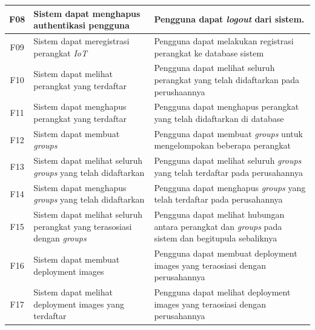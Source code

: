 \begin{table}
\begin{tabular}{|c|p{4.5cm}|p{8cm}|}
    \hline
    F08 & Sistem dapat menghapus authentikasi pengguna                                   & Pengguna dapat \textit{logout} dari sistem.                                                                \\
    \hline
    F09 & Sistem dapat meregistrasi perangkat \textit{IoT}                               & Pengguna dapat melakukan registrasi perangkat ke database sistem                                           \\
    \hline
    F10 & Sistem dapat melihat perangkat yang terdaftar                                  & Pengguna dapat melihat seluruh perangkat yang telah didaftarkan pada perushaannya                          \\
    \hline
    F11 & Sistem dapat menghapus perangkat yang terdaftar                                & Pengguna dapat menghapus perangkat yang telah didaftarkan di database                                      \\
    \hline
    F12 & Sistem dapat membuat \textit{groups}                                           & Pengguna dapat membuat \textit{groups} untuk mengelompokan beberapa perangkat                              \\
    \hline
    F13 & Sistem dapat melihat seluruh \textit{groups} yang telah didaftarkan            & Pengguna dapat melihat seluruh \textit{groups} yang telah terdaftar pada perusahannya                      \\
    \hline
    F14 & Sistem dapat menghapus \textit{groups} yang telah didaftarkan                  & Pengguna dapat menghapus \textit{groups} yang telah terdaftar pada perusahannya                            \\
    \hline
    F15 & Sistem dapat melihat seluruh perangkat yang terasosiasi dengan \textit{groups} & Pengguna dapat melihat hubungan antara perangkat dan \textit{groups} pada sistem dan begitupula sebaliknya \\
    \hline
    F16 & Sistem dapat membuat deployment images                                         & Pengguna dapat membuat deployment images yang teraosiasi dengan perusahannya                               \\
    \hline
    F17 & Sistem dapat melihat deployment images yang terdaftar                          & Pengguna dapat melihat deployment images yang teraosiasi dengan perusahannya                               \\
    \hline
  \end{tabular}
\end{table}

